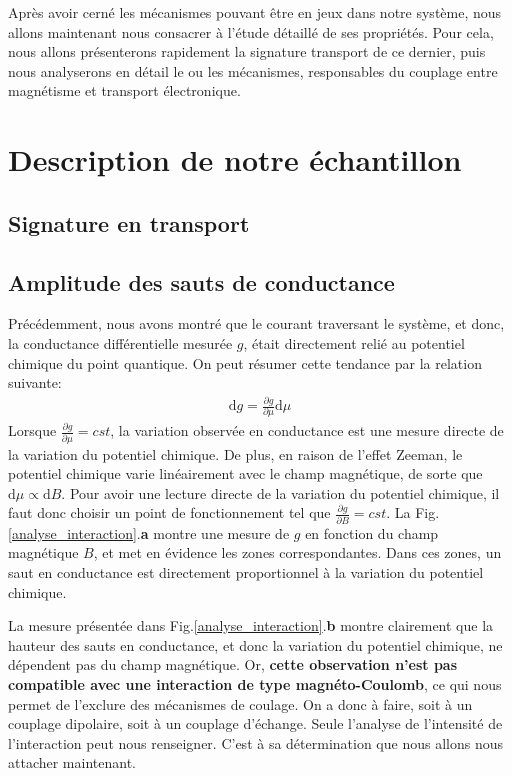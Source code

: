 Après avoir cerné les mécanismes pouvant être en jeux dans notre système, nous allons maintenant nous consacrer à l'étude détaillé de ses propriétés. Pour cela, nous allons présenterons rapidement la signature transport de ce dernier, puis nous analyserons en détail le ou les mécanismes, responsables du couplage entre magnétisme et transport électronique.

\section{Description de notre échantillon}

\subsection{Signature en transport}



\subsection{Amplitude des sauts de conductance}
Précédemment, nous avons montré que le courant traversant le système, et donc, la conductance différentielle mesurée $g$, était directement relié au potentiel chimique du point quantique. On peut résumer cette tendance par la relation suivante:
\begin{eqnarray}
\text{d}g = \frac{\partial g}{\partial \mu} \text{d} \mu
\end{eqnarray}
Lorsque $\frac{\partial g}{\partial \mu} = cst$, la variation observée en conductance est une mesure directe de la variation du potentiel chimique. De plus, en raison de l'effet Zeeman, le potentiel chimique varie linéairement avec le champ magnétique, de sorte que $\text{d}\mu \propto \text{d}B$. Pour avoir une lecture directe de la variation du potentiel chimique, il faut donc choisir un point de fonctionnement tel que $\frac{\partial g}{\partial B} = cst$. La Fig.\ref{analyse_interaction}.\textbf{a} montre une mesure de $g$ en fonction du champ magnétique $B$, et met en évidence les zones correspondantes. Dans ces zones, un saut en conductance est directement proportionnel à la variation du potentiel chimique. 

La mesure présentée dans Fig.\ref{analyse_interaction}.\textbf{b} montre clairement que la hauteur des sauts en conductance, et donc la variation du potentiel chimique, ne dépendent pas du champ magnétique. Or, \textbf{cette observation n'est pas compatible avec une interaction de type magnéto-Coulomb}, ce qui nous permet de l'exclure des mécanismes de coulage. On a donc à faire, soit à un couplage dipolaire, soit à un couplage d'échange. Seule l'analyse de l'intensité de l'interaction peut nous renseigner. C'est à sa détermination que nous allons nous attacher maintenant.

